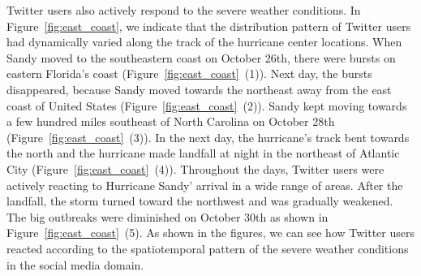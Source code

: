 Twitter users also actively respond to the severe weather conditions.
In Figure~\ref{fig:east_coast}, we indicate that the distribution pattern of Twitter users had dynamically varied along the track of the hurricane center locations.
When Sandy moved to the southeastern coast on October 26th, there were bursts on eastern Florida's coast (Figure~\ref{fig:east_coast}~(1)).
Next day, the bursts disappeared, because Sandy moved towards the northeast away from the east coast of United States (Figure~\ref{fig:east_coast}~(2)).
Sandy kept moving towards a few hundred miles southeast of North Carolina on October 28th (Figure~\ref{fig:east_coast}~(3)).
In the next day, the hurricane's track bent towards the north and the hurricane made landfall at night in the northeast of Atlantic City 
(Figure~\ref{fig:east_coast}~(4)).
Throughout the days, Twitter users were actively reacting to Hurricane Sandy' arrival in a wide range of areas.
After the landfall, the storm turned toward the northwest and was gradually weakened.
The big outbreaks were diminished on October 30th as shown in Figure~\ref{fig:east_coast}~(5).
As shown in the figures, we can see how Twitter users reacted according to the spatiotemporal pattern of the severe weather conditions in the social media domain.


